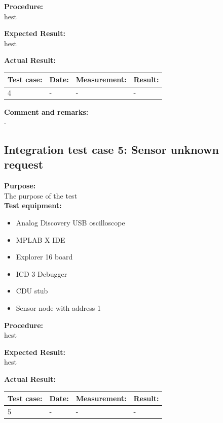 \textbf{Procedure:}\\
hest

\textbf{Expected Result:}\\
hest

\textbf{Actual Result:}\\
\begin{table}[H]
\centering
\begin{tabular}{|p{2cm}|p{2cm}|p{3cm}|p{2cm}|}\hline
\textbf{Test case:} & \textbf{Date:} & \textbf{Measurement:} & \textbf{Result:} \\ \hline
4 & - & - & - \\ \hline
\end{tabular}
\end{table}


\textbf{Comment and remarks:}\\
-\\

\subsection{Integration test case 5: Sensor unknown request}
\textbf{Purpose:}\\
The purpose of the test\\

\textbf{Test equipment:}
\begin{itemize}
\item Analog Discovery USB oscilloscope
\item MPLAB X IDE
\item Explorer 16 board
\item ICD 3 Debugger
\item CDU stub
\item Sensor node with address 1
\end{itemize}

\textbf{Procedure:}\\
hest

\textbf{Expected Result:}\\
hest

\textbf{Actual Result:}\\
\begin{table}[H]
\centering
\begin{tabular}{|p{2cm}|p{2cm}|p{3cm}|p{2cm}|}\hline
\textbf{Test case:} & \textbf{Date:} & \textbf{Measurement:} & \textbf{Result:} \\ \hline
5 & - & - & - \\ \hline
\end{tabular}
\end{table}


